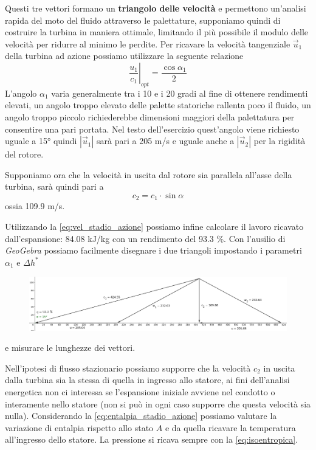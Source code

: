 \documentclass[a4paper,12pt]{article}
\begin{document}
Questi tre vettori formano un \textbf{triangolo delle velocità} e permettono un'analisi rapida del moto del fluido attraverso le palettature,
supponiamo quindi di costruire la turbina in maniera ottimale, limitando il più possibile il modulo delle velocità per ridurre al minimo le perdite.
Per ricavare la velocità tangenziale $\vec u_1$ della turbina ad azione possiamo utilizzare la seguente relazione
\begin{equation}
    \left.\frac{u_1}{c_1}\right|_{opt} = \frac{\cos \alpha_1}{2}
\end{equation}
L'angolo $\alpha_1$ varia generalmente tra i 10 e i 20 gradi al fine di ottenere rendimenti elevati, un angolo troppo elevato delle palette statoriche rallenta poco 
il fluido, un angolo troppo piccolo richiederebbe dimensioni maggiori della palettatura per consentire una pari portata.
Nel testo dell'esercizio quest'angolo viene richiesto uguale a 15° quindi $|\vec u_1|$ sarà pari a 205 m/s e uguale anche a $|\vec u_2|$ per la rigidità
del rotore.

Supponiamo ora che la velocità in uscita dal rotore sia parallela all'asse della turbina, sarà quindi pari a
\begin{equation}
    c_2 = c_1 \cdot \sin \alpha
\end{equation}
ossia 109.9 m/s.

Utilizzando la \eqref{eq:vel_stadio_azione} possiamo infine calcolare il lavoro ricavato dall'espansione: 84.08 kJ/kg con un rendimento del 93.3 \%.
Con l'ausilio di \textit{GeoGebra} possiamo facilmente disegnare i due triangoli impostando i parametri $\alpha_1$ e $\Delta h^*$
\begin{figure}[H]
    \label{fig:triangoli_azione}
    \centering
    \includegraphics[width=\linewidth]{media/triangoli_azione.png}
\end{figure}
e misurare le lunghezze dei vettori.

Nell'ipotesi di flusso stazionario possiamo supporre che la velocità $c_2$ in uscita dalla turbina sia la stessa di quella in ingresso allo statore,
ai fini dell'analisi energetica non ci interessa se l'espansione iniziale avviene nel condotto o interamente nello statore (non si può in ogni caso supporre che questa
velocità sia nulla).
Considerando la \eqref{eq:entalpia_stadio_azione} possiamo valutare la variazione di entalpia rispetto allo stato $A$ e da quella ricavare la temperatura all'ingresso
dello statore. La pressione si ricava sempre con la \eqref{eq:isoentropica}.
\end{document}
